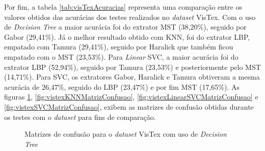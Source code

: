 \par Por fim, a tabela \autoref{tab:visTexAcuracias} representa uma comparação entre os valores obtidos das acurácias dos testes realizados no \textit{dataset} VisTex. Com o uso de \textit{Decision Tree} a maior acurácia foi do extrator MST (38,20\%), seguido por Gabor (29,41\%). Já o melhor resultado obtido com KNN, foi do extrator LBP, empatado com Tamura (29,41\%), seguido por Haralick que também ficou empatado com o MST (23,53\%). Para \textit{Linear} SVC, a maior acurácia foi do extrator LBP (52,94\%), seguido por Tamura (23,53\%) e posteriormente pelo MST (14,71\%). Para SVC, os extratores Gabor, Haralick e Tamura obtiveram a mesma acurácia de 26,47\%, seguido do LBP (23,47\%) e por fim MST (17,65\%). As figuras \ref{fig:vistexDecisionTreeMatrizConfusao}, \ref{fig:vistexKNNMatrizConfusao}, \ref{fig:vistexLinearSVCMatrizConfusao} e \ref{fig:vistexSVCMatrizConfusao}, exibem as matrizes de confusão obtidas durante os testes com o \textit{dataset} para fins de comparação.



\begin{figure}[H]
    \centering
    \caption{Matrizes de confusão para o \textit{dataset} VisTex com uso de \textit{Decision Tree}}
    \qquad
    \label{fig:vistexDecisionTreeMatrizConfusao}
\end{figure}

